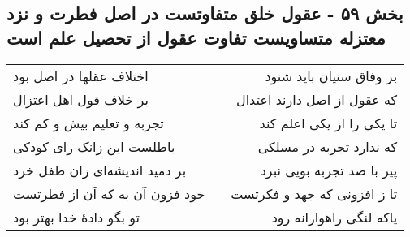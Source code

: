 \begin{center}
\section*{بخش ۵۹ - عقول خلق متفاوتست در اصل فطرت و نزد  معتزله متساویست تفاوت عقول از تحصیل  علم است}
\label{sec:sh059}
\begin{longtable}{l p{0.5cm} r}
اختلاف عقلها در اصل بود
&&
بر وفاق سنیان باید شنود
\\
بر خلاف قول اهل اعتزال
&&
که عقول از اصل دارند اعتدال
\\
تجربه و تعلیم بیش و کم کند
&&
تا یکی را از یکی اعلم کند
\\
باطلست این زانک رای کودکی
&&
که ندارد تجربه در مسلکی
\\
بر دمید اندیشه‌ای زان طفل خرد
&&
پیر با صد تجربه بویی نبرد
\\
خود فزون آن به که آن از فطرتست
&&
تا ز افزونی که جهد و فکرتست
\\
تو بگو دادهٔ خدا بهتر بود
&&
یاکه لنگی راهوارانه رود
\\
\end{longtable}
\end{center}
